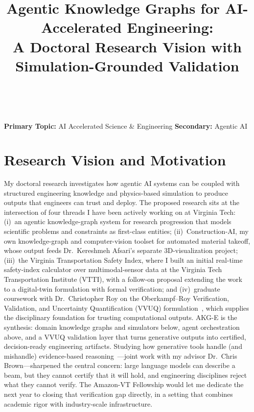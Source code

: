 \documentclass[conference, 10pt]{IEEEtran}
\title{Agentic Knowledge Graphs for AI-Accelerated Engineering: \\
       A Doctoral Research Vision with Simulation-Grounded Validation}
\author{
    \IEEEauthorblockN{Jason Cusati}\\
    \IEEEauthorblockA{PhD Candidate, Virginia Tech \\
    Advisor: Chris Brown}
}
\date{}
\begin{document}
\maketitle
\thispagestyle{empty}

\vspace{-1.5em}

\noindent\textbf{Primary Topic:} AI Accelerated Science \& Engineering \hfill
\textbf{Secondary:} Agentic AI

\vspace{0.5em}

\section*{Research Vision and Motivation}

My doctoral research investigates how agentic AI systems can be coupled with structured engineering knowledge and physics-based simulation to produce outputs that engineers can trust and deploy. The proposed research sits at the intersection of four threads I have been actively working on at Virginia Tech: (i)~an agentic knowledge-graph system for research progression that models scientific problems and constraints as first-class entities; (ii)~Construction-AI, my own knowledge-graph and computer-vision toolset for automated material takeoff, whose output feeds Dr.~Kereshmeh Afsari's separate 3D-visualization project; (iii)~the Virginia Transportation Safety Index, where I built an initial real-time safety-index calculator over multimodal-sensor data at the Virginia Tech Transportation Institute (VTTI), with a follow-on proposal extending the work to a digital-twin formulation with formal verification; and (iv)~graduate coursework with Dr.~Christopher Roy on the Oberkampf--Roy Verification, Validation, and Uncertainty Quantification (VVUQ) formulation~\cite{Oberkampf2010VVUQ}, which supplies the disciplinary foundation for trusting computational outputs. AKG-E is the synthesis: domain knowledge graphs and simulators below, agent orchestration above, and a VVUQ validation layer that turns generative outputs into certified, decision-ready engineering artifacts. Studying how generative tools handle (and mishandle) evidence-based reasoning~\cite{Ji2023HallucinationSurvey}---joint work with my advisor Dr.~Chris Brown---sharpened the central concern: large language models can describe a beam, but they cannot certify that it will hold, and engineering disciplines reject what they cannot verify. The Amazon-VT Fellowship would let me dedicate the next year to closing that verification gap directly, in a setting that combines academic rigor with industry-scale infrastructure.
\end{document}
